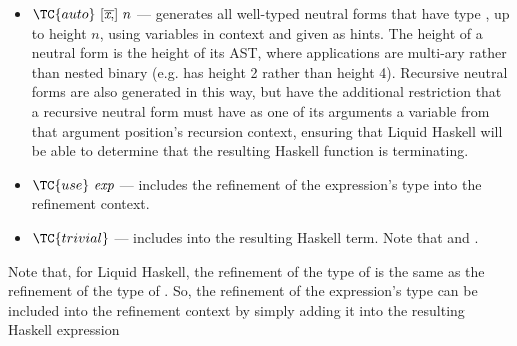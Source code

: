 \begin{itemize}
\begin{itemize}
    \item
    $\TC{auto} ~ [\overline{\textit{x} ,}] ~ n$ --- generates all well-typed neutral forms that have type , up to height $n$, using variables in context and given as hints. 
    The height of a neutral form is the height of its AST, where applications are multi-ary rather than nested binary (e.g.  has height 2 rather than height 4).
    Recursive neutral forms are also generated in this way, but have the additional restriction that a recursive neutral form must have as one of its arguments a variable from that argument position's recursion context, ensuring that Liquid Haskell will be able to determine that the resulting Haskell function is terminating.
    \item $\TC{use} ~ \textit{exp}$ --- includes the refinement of the expression's type into the refinement context.
    \item $\TC{trivial}$ --- includes  into the resulting Haskell term. Note that  and .
  \end{itemize}
\end{itemize}



Note that, for Liquid Haskell, the refinement of the type of  is the same as the refinement of the type of .
So, the refinement of the expression's type can be included into the refinement context by simply adding it into the resulting Haskell expression

  
